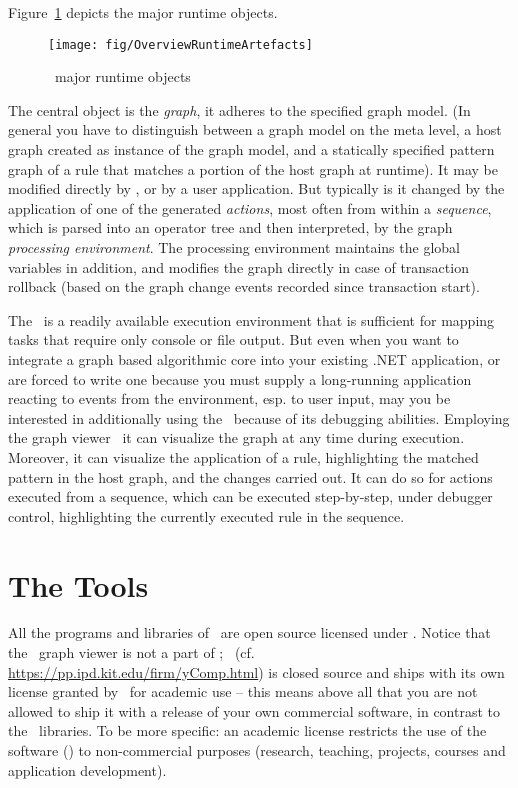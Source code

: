 Figure~\ref{process} depicts the major runtime objects.

\begin{figure}[htbp]
  \centering
  \texttt{[image: fig/OverviewRuntimeArtefacts]}
  \caption{\GrG\ major runtime objects}
  \label{process}
\end{figure}

The central object is the \emph{graph}, it adheres to the specified graph model.
(In general you have to distinguish between a graph model on the meta level, a host graph created as instance of the graph model, and a statically specified pattern graph of a rule that matches a portion of the host graph at runtime).
It may be modified directly by \GrShell, or by a user application.
But typically is it changed by the application of one of the generated \emph{actions}, most often from within a \emph{sequence}, which is parsed into an operator tree and then interpreted, by the graph \emph{processing environment}.
The processing environment maintains the global variables in addition, and modifies the graph directly in case of transaction rollback (based on the graph change events recorded since transaction start).

The \GrShell\ is a readily available execution environment that is sufficient for mapping tasks that require only console or file output.
But even when you want to integrate a graph based algorithmic core into your existing .NET application, 
or are forced to write one because you must supply a long-running application reacting to events from the environment, esp. to user input,
may you be interested in additionally using the \GrShell\ because of its debugging abilities.
Employing the graph viewer \yComp\ it can visualize the graph at any time during execution.
Moreover, it can visualize the application of a rule, highlighting the matched pattern in the host graph, and the changes carried out.
It can do so for actions executed from a sequence, which can be executed step-by-step, under debugger control, highlighting the currently executed rule in the sequence.

\section{The Tools}

All the programs and libraries of \GrG\ are open source licensed under .
Notice that the \yComp\ graph viewer is not a part of \GrG ; \yComp\ (cf. \url{https://pp.ipd.kit.edu/firm/yComp.html}) is closed source and ships with its own license granted by \yFiles\ for academic use --
this means above all that you are not allowed to ship it with a release of your own commercial software, in contrast to the \GrG\ libraries.
To be more specific: an academic license restricts the use of the software (\yComp) to non-commercial purposes (research, teaching, projects, courses and application development).

